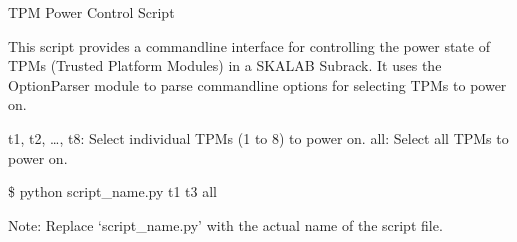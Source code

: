 \documentclass[letterpaper,10pt,english]{sphinxmanual}
\begin{document}
\begin{fulllineitems}
\label{\detokenize{toolsdocs:power_on_tpm.usage_hexample}}
\pysigstartsignatures
{}
\pysigstopsignatures
\sphinxAtStartPar
TPM Power Control Script

\sphinxAtStartPar
This script provides a command\sphinxhyphen{}line interface for controlling the power state of TPMs (Trusted Platform Modules) in a SKALAB Subrack. It uses the OptionParser module to parse command\sphinxhyphen{}line options for selecting TPMs to power on.
\begin{description}
\sphinxAtStartPar
\textendash{}t1, \textendash{}t2, …, \textendash{}t8: Select individual TPMs (1 to 8) to power on.
\textendash{}all: Select all TPMs to power on.

\sphinxAtStartPar
\$ python script\_name.py \textendash{}t1 \textendash{}t3 \textendash{}all

\end{description}

\sphinxAtStartPar
Note: Replace ‘script\_name.py’ with the actual name of the script file.

\end{fulllineitems}

\label{\detokenize{toolsdocs:module-power_off_tpm}}
\end{document}
